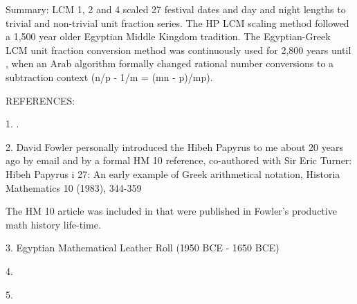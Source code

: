 \documentclass[12pt]{article}
\begin{document}
Summary: LCM 1, 2 and 4 scaled 27 festival dates and day and night lengths to trivial and non-trivial unit fraction series. The HP LCM scaling method followed a 1,500 year older Egyptian Middle Kingdom tradition. The Egyptian-Greek LCM unit fraction conversion method was continuously used for 2,800 years until , when an Arab algorithm formally changed rational number conversions to a subtraction context (n/p - 1/m = (mn - p)/mp).

REFERENCES:

1. .

2. David Fowler personally introduced the Hibeh Papyrus to me about 20 years ago by email and by a formal HM 10 reference, co-authored with Sir Eric Turner: Hibeh Papyrus i 27: An early example of Greek arithmetical notation, Historia Mathematics 10 (1983), 344-359

The HM 10 article was included in 
that were published in Fowler's productive math history life-time.

3. Egyptian Mathematical Leather Roll (1950 BCE - 1650 BCE)

4.  

5. 

\end{document}
